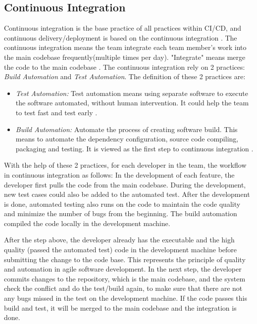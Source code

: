 \subsection{Continuous Integration}
Continuous integration is the base practice of all practices within CI/CD, and continuous delivery/deployment is based on the continuous integration \cite{pittet2018continuous}.
The continuous integration means the team integrate each team member's work into the main codebase frequently(multiple times per day). "Integrate" means merge the code to the main codebase \cite{fowler2006continuous}. The continuous integration rely on 2 practices: \textit{Build Automation} and \textit{Test Automation}. The definition of these 2 practices are:
\begin{itemize}
    \label{TestA}
    \item \textit{Test Automation:} Test automation means using separate software to execute the software automated, without human intervention. It could help the team to test fast and test early \cite{Testauto48:online}. 
    \item \textit{Build Automation:} Automate the process of creating software build. This means to automate the dependency configuration, source code compiling, packaging and testing. It is viewed as the first step to continuous integration \cite{Buildaut62:online}.
\end{itemize}
With the help of these 2 practices, for each developer in the team, the workflow \cite{fowler2006continuous} in continuous integration as follows: In the development of each feature, the developer first pulls the code from the main codebase. During the development, new test cases could also be added to the automated test. After the development is done, automated testing also runs on the code to maintain the code quality and minimize the number of bugs from the beginning. The build automation compiled the code locally in the development machine. 
\par
After the step above, the developer already has the executable and the high quality (passed the automated test) code in the development machine before submitting the change to the code base. This represents the principle of quality and automation in agile software development. In the next step, the developer commits changes to the repository, which is the main codebase, and the system check the conflict and do the test/build again, to make sure that there are not any bugs missed in the test on the development machine.
If the code passes this build and test, it will be merged to the main codebase and the integration is done.

